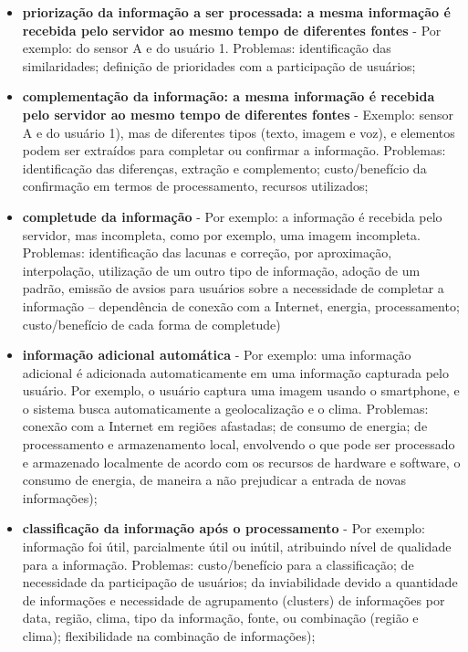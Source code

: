 \documentclass[12pt]{article}
\begin{document}
\begin{itemize}
		\begin{itemize}
			\item \textbf{priorização da informação a ser processada: a mesma informação é recebida pelo servidor ao mesmo tempo de diferentes fontes} - Por exemplo: do sensor A e do usuário 1. Problemas: identificação das similaridades; definição de prioridades com a participação de usuários;
			\item \textbf{complementação da informação: a mesma informação é recebida pelo servidor ao mesmo tempo de diferentes fontes} - Exemplo: sensor A e do usuário 1), mas de diferentes tipos (texto, imagem e voz), e elementos podem ser extraídos para completar ou confirmar a informação. Problemas: identificação das diferenças, extração e complemento; custo/benefício da  confirmação em termos de processamento, recursos utilizados;
			\item \textbf{completude da informação} - Por exemplo: a informação é recebida pelo servidor, mas incompleta, como por exemplo, uma imagem incompleta. Problemas: identificação das lacunas e correção, por aproximação, interpolação, utilização de um outro tipo de informação, adoção de um padrão, emissão de avsios para usuários sobre a necessidade de completar a informação – dependência de conexão com a Internet, energia, processamento; custo/benefício de cada forma de completude)
			\item \textbf{informação adicional automática} - Por exemplo: uma informação adicional é adicionada automaticamente em uma informação capturada pelo usuário. Por exemplo, o usuário captura uma imagem usando o smartphone, e o sistema busca automaticamente a geolocalização e o clima. Problemas: conexão com a Internet em regiões afastadas; de consumo de energia; de processamento e armazenamento local, envolvendo o que pode ser processado e armazenado localmente de acordo com os recursos de hardware e software, o consumo de energia, de maneira a não prejudicar a entrada de novas informações);
			\item \textbf{classificação da informação após o processamento} - Por exemplo: informação foi útil, parcialmente útil ou inútil, atribuindo nível de qualidade para a informação. Problemas: custo/benefício para a classificação; de necessidade da participação de usuários; da inviabilidade devido a quantidade de informações e necessidade de agrupamento (clusters) de informações por data, região, clima, tipo da informação, fonte, ou combinação (região e clima); flexibilidade na combinação de informações);
		\end{itemize}
\end{itemize}
\end{document}
